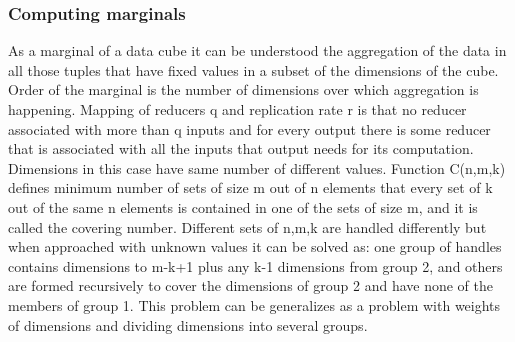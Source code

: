 \subsubsection{Computing marginals} \label{marginals}
As a marginal of a data cube it can be understood the aggregation of the data in all those tuples that have fixed values in a subset of the dimensions of the cube. Order of the marginal is the number of dimensions over which aggregation is happening. Mapping of reducers q and replication rate r is that no reducer associated with more than q inputs and for every output there is some reducer that is associated with all the inputs that output needs for its computation. Dimensions in this case have same number of different values.
Function C(n,m,k) defines minimum number of sets of size m out of n elements that every set of k out of the same n elements is contained in one of the sets of size m, and it is called the covering number.
Different sets of n,m,k are handled differently but when approached with unknown values it can be solved as: one group of handles contains dimensions to m-k+1 plus any k-1 dimensions from group 2, and others are formed recursively to cover the dimensions of group 2 and have none of the members of group 1.
This problem can be generalizes as a problem with weights of dimensions and dividing dimensions into several groups. \cite{marginals}

